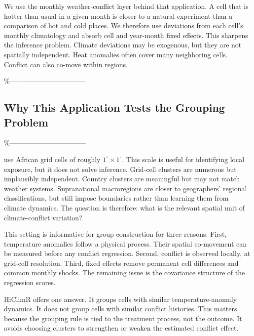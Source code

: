 \documentclass[
]{article}
\begin{document}
We use the monthly weather-conflict layer behind that application. A
cell that is hotter than usual in a given month is closer to a natural
experiment than a comparison of hot and cold places. We therefore use
deviations from each cell's monthly climatology and absorb cell and
year-month fixed effects. This sharpens the inference problem. Climate
deviations may be exogenous, but they are not spatially independent.
Heat anomalies often cover many neighboring cells. Conflict can also
co-move within regions.

\%---------------------------------

\subsection{Why This Application Tests the Grouping Problem}

\%---------------------------------

\citet{burke2024} use African grid cells of roughly
\(1^\circ\times1^\circ\). This scale is useful for identifying local
exposure, but it does not solve inference. Grid-cell clusters are
numerous but implausibly independent. Country clusters are meaningful
but may not match weather systems. Supranational macroregions are closer
to geographers' regional classifications, but still impose boundaries
rather than learning them from climate dynamics. The question is
therefore: what is the relevant spatial unit of climate-conflict
variation?

This setting is informative for group construction for three reasons.
First, temperature anomalies follow a physical process. Their spatial
co-movement can be measured before any conflict regression. Second,
conflict is observed locally, at grid-cell resolution. Third, fixed
effects remove permanent cell differences and common monthly shocks. The
remaining issue is the covariance structure of the regression scores.

HiClimR offers one answer. It groups cells with similar
temperature-anomaly dynamics. It does not group cells with similar
conflict histories. This matters because the grouping rule is tied to
the treatment process, not the outcome. It avoids choosing clusters to
strengthen or weaken the estimated conflict effect.
\end{document}
